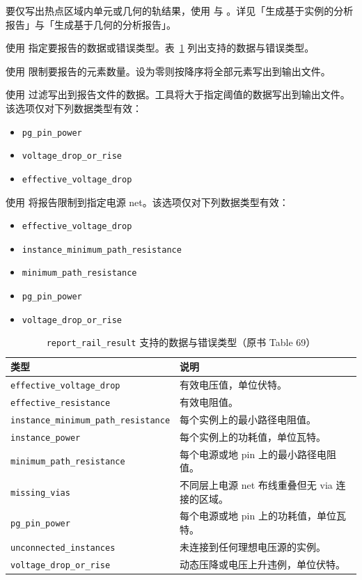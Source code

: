要仅写出热点区域内单元或几何的轨结果，使用  与 。详见「生成基于实例的分析报告」与「生成基于几何的分析报告」。

使用  指定要报告的数据或错误类型。表~\ref{tab:report-types} 列出支持的数据与错误类型。

使用  限制要报告的元素数量。设为零则按降序将全部元素写出到输出文件。

使用  过滤写出到报告文件的数据。工具将大于指定阈值的数据写出到输出文件。该选项仅对下列数据类型有效：
\begin{itemize}
  \item \texttt{pg\_pin\_power}
  \item \texttt{voltage\_drop\_or\_rise}
  \item \texttt{effective\_voltage\_drop}
\end{itemize}

使用  将报告限制到指定电源 net。该选项仅对下列数据类型有效：
\begin{itemize}
  \item \texttt{effective\_voltage\_drop}
  \item \texttt{instance\_minimum\_path\_resistance}
  \item \texttt{minimum\_path\_resistance}
  \item \texttt{pg\_pin\_power}
  \item \texttt{voltage\_drop\_or\_rise}
\end{itemize}

\begin{table}[htbp]
\centering
\caption{\texttt{report\_rail\_result} 支持的数据与错误类型（原书 Table 69）}
\label{tab:report-types}
\small
\begin{tabularx}{\textwidth}{@{}l X@{}}
\toprule
\textbf{类型} & \textbf{说明} \\
\midrule
\texttt{effective\_voltage\_drop} & 有效电压值，单位伏特。 \\
\texttt{effective\_resistance} & 有效电阻值。 \\
\texttt{instance\_minimum\_path\_resistance} & 每个实例上的最小路径电阻值。 \\
\texttt{instance\_power} & 每个实例上的功耗值，单位瓦特。 \\
\texttt{minimum\_path\_resistance} & 每个电源或地 pin 上的最小路径电阻值。 \\
\texttt{missing\_vias} & 不同层上电源 net 布线重叠但无 via 连接的区域。 \\
\texttt{pg\_pin\_power} & 每个电源或地 pin 上的功耗值，单位瓦特。 \\
\texttt{unconnected\_instances} & 未连接到任何理想电压源的实例。 \\
\texttt{voltage\_drop\_or\_rise} & 动态压降或电压上升违例，单位伏特。 \\
\bottomrule
\end{tabularx}
\end{table}

